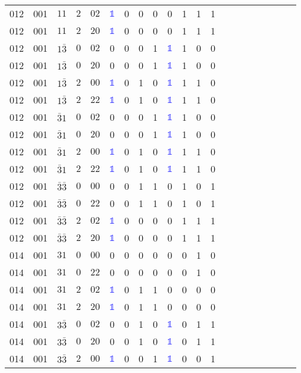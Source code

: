 \begin{longtable*}{c| cccccccccccccccccccc }
012& 001& $11$& $2$& $02$& \textcolor{blue}{$\mathds{1}$}& 0& 0& 0& 0& 1& 1& 1\\
012& 001& $11$& $2$& $20$& \textcolor{blue}{$\mathds{1}$}& 0& 0& 0& 0& 1& 1& 1\\
012& 001& $1\bar{3}$& $0$& $02$& 0& 0& 0& 1& \textcolor{blue}{$\mathds{1}$}& 1& 0& 0\\
012& 001& $1\bar{3}$& $0$& $20$& 0& 0& 0& 1& \textcolor{blue}{$\mathds{1}$}& 1& 0& 0\\
012& 001& $1\bar{3}$& $2$& $00$& \textcolor{blue}{$\mathds{1}$}& 0& 1& 0& \textcolor{blue}{$\mathds{1}$}& 1& 1& 0\\
012& 001& $1\bar{3}$& $2$& $22$& \textcolor{blue}{$\mathds{1}$}& 0& 1& 0& \textcolor{blue}{$\mathds{1}$}& 1& 1& 0\\
012& 001& $\bar{3}1$& $0$& $02$& 0& 0& 0& 1& \textcolor{blue}{$\mathds{1}$}& 1& 0& 0\\
012& 001& $\bar{3}1$& $0$& $20$& 0& 0& 0& 1& \textcolor{blue}{$\mathds{1}$}& 1& 0& 0\\
012& 001& $\bar{3}1$& $2$& $00$& \textcolor{blue}{$\mathds{1}$}& 0& 1& 0& \textcolor{blue}{$\mathds{1}$}& 1& 1& 0\\
012& 001& $\bar{3}1$& $2$& $22$& \textcolor{blue}{$\mathds{1}$}& 0& 1& 0& \textcolor{blue}{$\mathds{1}$}& 1& 1& 0\\
012& 001& $\bar{3}\bar{3}$& $0$& $00$& 0& 0& 1& 1& 0& 1& 0& 1\\
012& 001& $\bar{3}\bar{3}$& $0$& $22$& 0& 0& 1& 1& 0& 1& 0& 1\\
012& 001& $\bar{3}\bar{3}$& $2$& $02$& \textcolor{blue}{$\mathds{1}$}& 0& 0& 0& 0& 1& 1& 1\\
012& 001& $\bar{3}\bar{3}$& $2$& $20$& \textcolor{blue}{$\mathds{1}$}& 0& 0& 0& 0& 1& 1& 1\\
014& 001& $31$& $0$& $00$& 0& 0& 0& 0& 0& 0& 1& 0\\
014& 001& $31$& $0$& $22$& 0& 0& 0& 0& 0& 0& 1& 0\\
014& 001& $31$& $2$& $02$& \textcolor{blue}{$\mathds{1}$}& 0& 1& 1& 0& 0& 0& 0\\
014& 001& $31$& $2$& $20$& \textcolor{blue}{$\mathds{1}$}& 0& 1& 1& 0& 0& 0& 0\\
014& 001& $3\bar{3}$& $0$& $02$& 0& 0& 1& 0& \textcolor{blue}{$\mathds{1}$}& 0& 1& 1\\
014& 001& $3\bar{3}$& $0$& $20$& 0& 0& 1& 0& \textcolor{blue}{$\mathds{1}$}& 0& 1& 1\\
014& 001& $3\bar{3}$& $2$& $00$& \textcolor{blue}{$\mathds{1}$}& 0& 0& 1& \textcolor{blue}{$\mathds{1}$}& 0& 0& 1\\

\end{longtable*}
